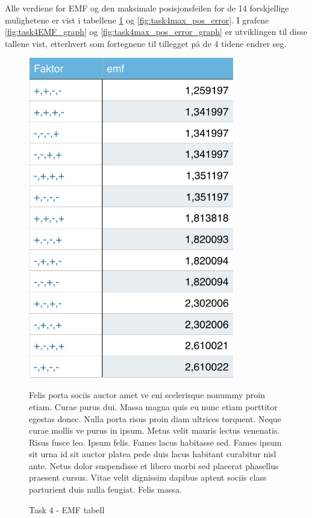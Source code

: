 Alle verdiene for EMF og den maksimale posisjonsfeilen for de 14 forskjellige mulighetene er vist i tabellene \ref{fig:task4EMF} og \ref{fig:task4max_pos_error}. I grafene \ref{fig:task4EMF_graph} og \ref{fig:task4max_pos_error_graph} er utviklingen til disse tallene vist, etterhvert som fortegnene til tillegget på de 4 tidene endrer seg. 

	\begin{figure}[h]
		\begin{minipage}{.5\textwidth}
			\centering
			\includegraphics[width=0.8\textwidth]{sections/Exercise4/task4emf.png}
				\caption{Task 4 - EMF tabell}
				\label{fig:task4EMF}
		\end{minipage}
		\vspace{20 mm}
		\begin{minipage}{.5\textwidth}
			Felis porta sociis auctor amet ve eni scelerisque nonummy proin etiam. Curae purus dui. Massa magna quis eu nunc etiam porttitor egestas donec. Nulla porta risus proin diam ultrices torquent. Neque curae mollis ve purus in ipsum. Metus velit mauris lectus venenatis. Risus fusce leo. Ipsum felis. Fames lacus habitasse sed. Fames ipsum sit urna id sit auctor platea pede duis lacus habitant curabitur nisl ante. Netus dolor suspendisse et libero morbi sed placerat phasellus praesent cursus. Vitae velit dignissim dapibus aptent sociis class parturient duis nulla feugiat. Felis massa.
		\end{minipage}


\end{figure}
